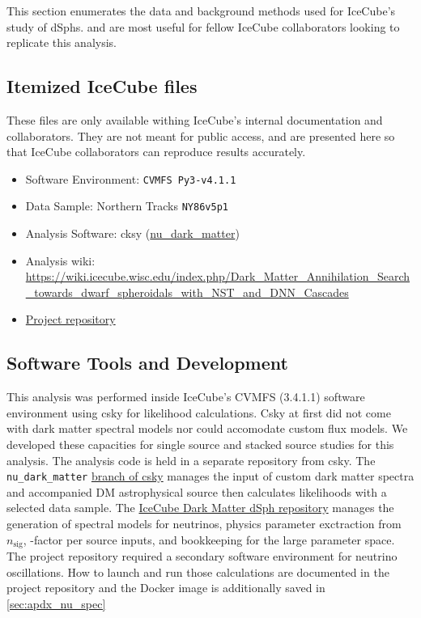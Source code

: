 This section enumerates the data and background methods used for IceCube's study of dSphs.
 and  are most useful for fellow IceCube collaborators looking to replicate this analysis.

\subsection{Itemized IceCube files}\label{sec:icDM_data}

These files are only available withing IceCube's internal documentation and collaborators.
They are not meant for public access, and are presented here so that IceCube collaborators can reproduce results accurately.

\begin{itemize}
    \item Software Environment: \texttt{CVMFS Py3-v4.1.1}
    \item Data Sample: Northern Tracks \texttt{NY86v5p1}
    \item Analysis Software: cksy (\href{https://github.com/icecube/csky/tree/nu\_dark\_matter}{nu\_dark\_matter})
    \item Analysis wiki: \url{https://wiki.icecube.wisc.edu/index.php/Dark\_Matter\_Annihilation\_Search\_towards\_dwarf\_spheroidals\_with\_NST\_and\_DNN\_Cascades}
    \item \href{https://github.com/salaza82/IceCube_dark_matter_dsph}{Project repository}
\end{itemize}

\subsection{Software Tools and Development}\label{sec:icDM_tools}


This analysis was performed inside IceCube's CVMFS (3.4.1.1) software environment using csky for likelihood calculations.
Csky at first did not come with dark matter spectral models nor could accomodate custom flux models.
We developed these capacities for single source and stacked source studies for this analysis.
The analysis code is held in a separate repository from csky.
The \texttt{nu\_dark\_matter} \href{https://github.com/icecube/csky/tree/nu\_dark\_matter}{branch of csky} manages the input of custom dark matter spectra and accompanied DM astrophysical source then calculates likelihoods with a selected data sample.
The \href{https://github.com/salaza82/IceCube_dark_matter_dsph}{IceCube Dark Matter dSph repository} manages the generation of spectral models for neutrinos, physics parameter exctraction from $n_{\mathrm{sig}}$, \J-factor per source inputs, and bookkeeping for the large parameter space.
The project repository required a secondary software environment for neutrino oscillations.
How to launch and run those calculations are documented in the project repository and the Docker image is additionally saved in \cref{sec:apdx_nu_spec}

